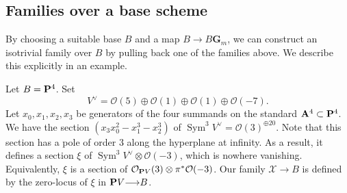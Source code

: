 \documentclass[reqno]{amsart}
\renewcommand{\to}{{\longrightarrow}}
\renewcommand {\P}{{\bf P}}
\providecommand {\A}{{\bf A}}
\providecommand{\Sym}{\operatorname{Sym}}
\numberwithin{equation}{section}
\newcommand{\G}{\mathbf{G}}
\begin{document}
\subsection{Families over a base scheme}\label{sec:schematicexample}
By choosing a suitable base $B$ and a map $B \to B \G_m$, we
can construct an isotrivial family over $B$ by pulling back one of the
families above.  We describe this explicitly in an example.

Let $B = \P^4$.  Set
\[V^{\vee} = \mathcal{O}(5) \oplus \mathcal{O}(1) \oplus \mathcal{O}(1) \oplus
  \mathcal{O}(-7).\] Let $x_0, x_1, x_2, x_3$ be generators of the four
summands on the standard $\A^4 \subset \P^4$.  We have
the section $(x_3x_0^2-x_1^3-x_2^3)$ of
$\Sym^3 V^{\vee} = \mathcal{O}(3)^{\oplus 20}$.  Note that this section has a
pole of order $3$ along the hyperplane at infinity.  As a result, it
defines a section $\xi$ of $\Sym^3 V^{\vee} \otimes \mathcal{O}(-3)$, which is
nowhere vanishing.  Equivalently, $\xi$ is a section of
$\mathcal{O}_{\P V}(3) \otimes \pi^* \mathcal{O}(-3)$.  Our family
$\mathcal{X} \to B$ is defined by the zero-locus of $\xi$ in
$\P V \to B$.
\end{document}
